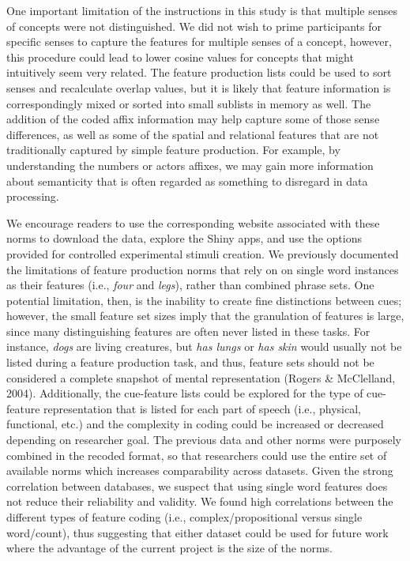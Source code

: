\documentclass[english,,man]{apa6}
\begin{document}
One important limitation of the instructions in this study is that multiple senses of concepts were not distinguished. We did not wish to prime participants for specific senses to capture the features for multiple senses of a concept, however, this procedure could lead to lower cosine values for concepts that might intuitively seem very related. The feature production lists could be used to sort senses and recalculate overlap values, but it is likely that feature information is correspondingly mixed or sorted into small sublists in memory as well. The addition of the coded affix information may help capture some of those sense differences, as well as some of the spatial and relational features that are not traditionally captured by simple feature production. For example, by understanding the numbers or actors affixes, we may gain more information about semanticity that is often regarded as something to disregard in data processing.

We encourage readers to use the corresponding website associated with these norms to download the data, explore the Shiny apps, and use the options provided for controlled experimental stimuli creation. We previously documented the limitations of feature production norms that rely on on single word instances as their features (i.e., \emph{four} and \emph{legs}), rather than combined phrase sets. One potential limitation, then, is the inability to create fine distinctions between cues; however, the small feature set sizes imply that the granulation of features is large, since many distinguishing features are often never listed in these tasks. For instance, \emph{dogs} are living creatures, but \emph{has lungs} or \emph{has skin} would usually not be listed during a feature production task, and thus, feature sets should not be considered a complete snapshot of mental representation (Rogers \& McClelland, 2004). Additionally, the cue-feature lists could be explored for the type of cue-feature representation that is listed for each part of speech (i.e., physical, functional, etc.) and the complexity in coding could be increased or decreased depending on researcher goal. The previous data and other norms were purposely combined in the recoded format, so that researchers could use the entire set of available norms which increases comparability across datasets. Given the strong correlation between databases, we suspect that using single word features does not reduce their reliability and validity. We found high correlations between the different types of feature coding (i.e., complex/propositional versus single word/count), thus suggesting that either dataset could be used for future work where the advantage of the current project is the size of the norms.
\end{document}
